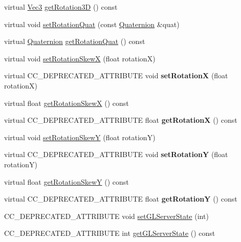 \begin{Indent}
\begin{DoxyCompactItemize}
\item 
virtual \hyperlink{classVec3}{Vec3} \hyperlink{classNode_a9aab6e44008bf374051cc87c76d9079f}{get\+Rotation3D} () const
\item 
virtual void \hyperlink{classNode_a3da11f365bd691d42161cca0c729e5e5}{set\+Rotation\+Quat} (const \hyperlink{classQuaternion}{Quaternion} \&quat)
\item 
virtual \hyperlink{classQuaternion}{Quaternion} \hyperlink{classNode_a6200a7e63f7ccccabc82a7a4554e7d36}{get\+Rotation\+Quat} () const
\item 
virtual void \hyperlink{classNode_a63c7e9e926cf94379b437a41eba0b111}{set\+Rotation\+SkewX} (float rotationX)
\item 
\mbox{\label{classNode_ad1bd25ac980529f8a410523a42ab6e2a}} 
virtual C\+C\+\_\+\+D\+E\+P\+R\+E\+C\+A\+T\+E\+D\+\_\+\+A\+T\+T\+R\+I\+B\+U\+TE void {\bfseries set\+RotationX} (float rotationX)
\item 
virtual float \hyperlink{classNode_a1102a3896c8af0bd11d1cf9a8b89f4fa}{get\+Rotation\+SkewX} () const
\item 
\mbox{\label{classNode_aac0fe1e486b4d0bbbc7e2a4203865285}} 
virtual C\+C\+\_\+\+D\+E\+P\+R\+E\+C\+A\+T\+E\+D\+\_\+\+A\+T\+T\+R\+I\+B\+U\+TE float {\bfseries get\+RotationX} () const
\item 
virtual void \hyperlink{classNode_abb8744ead180b08a285e56f59e5e178c}{set\+Rotation\+SkewY} (float rotationY)
\item 
\mbox{\label{classNode_a66f99fb391706801bd5c162654a8786c}} 
virtual C\+C\+\_\+\+D\+E\+P\+R\+E\+C\+A\+T\+E\+D\+\_\+\+A\+T\+T\+R\+I\+B\+U\+TE void {\bfseries set\+RotationY} (float rotationY)
\item 
virtual float \hyperlink{classNode_acd3ba7aeb143dbf516bfbdff965ee53a}{get\+Rotation\+SkewY} () const
\item 
\mbox{\label{classNode_aee61900edf93cad256bd250f69e02065}} 
virtual C\+C\+\_\+\+D\+E\+P\+R\+E\+C\+A\+T\+E\+D\+\_\+\+A\+T\+T\+R\+I\+B\+U\+TE float {\bfseries get\+RotationY} () const
\item 
C\+C\+\_\+\+D\+E\+P\+R\+E\+C\+A\+T\+E\+D\+\_\+\+A\+T\+T\+R\+I\+B\+U\+TE void \hyperlink{classNode_a5eb3c79871dc219ae8345fc72c7a00de}{set\+G\+L\+Server\+State} (int)
\item 
C\+C\+\_\+\+D\+E\+P\+R\+E\+C\+A\+T\+E\+D\+\_\+\+A\+T\+T\+R\+I\+B\+U\+TE int \hyperlink{classNode_a4817ce95fa64827e8a58645e5b5854ae}{get\+G\+L\+Server\+State} () const

\end{DoxyCompactItemize}
\end{Indent}
